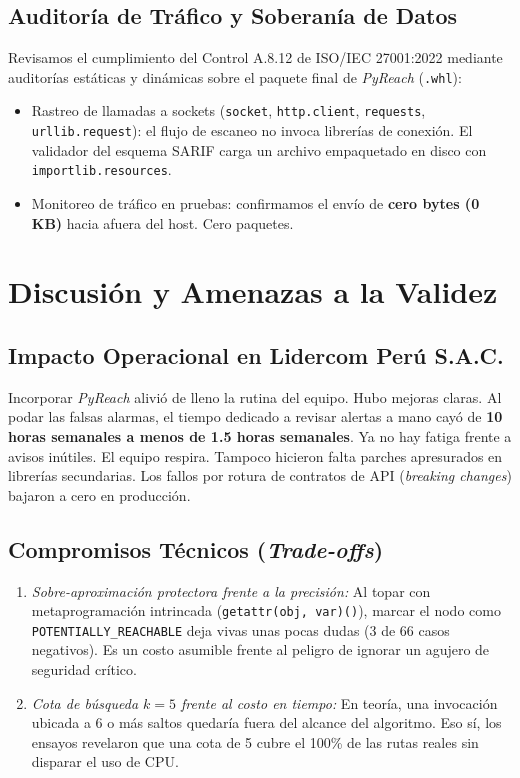\documentclass[conference]{IEEEtran}
\begin{document}
\subsection{Auditoría de Tráfico y Soberanía de Datos}
Revisamos el cumplimiento del Control A.8.12 de ISO/IEC 27001:2022 mediante auditorías estáticas y dinámicas sobre el paquete final de \textit{PyReach} (\texttt{.whl}):
\begin{itemize}
    \item Rastreo de llamadas a sockets (\texttt{socket}, \texttt{http.client}, \texttt{requests}, \texttt{urllib.request}): el flujo de escaneo no invoca librerías de conexión. El validador del esquema SARIF carga un archivo empaquetado en disco con \texttt{importlib.resources}.
    \item Monitoreo de tráfico en pruebas: confirmamos el envío de \textbf{cero bytes (0 KB)} hacia afuera del host. Cero paquetes.
\end{itemize}

\section{Discusión y Amenazas a la Validez}

\subsection{Impacto Operacional en Lidercom Perú S.A.C.}
Incorporar \textit{PyReach} alivió de lleno la rutina del equipo. Hubo mejoras claras. Al podar las falsas alarmas, el tiempo dedicado a revisar alertas a mano cayó de \textbf{10 horas semanales a menos de 1.5 horas semanales}. Ya no hay fatiga frente a avisos inútiles. El equipo respira. Tampoco hicieron falta parches apresurados en librerías secundarias. Los fallos por rotura de contratos de API (\textit{breaking changes}) bajaron a cero en producción.

\subsection{Compromisos Técnicos (\textit{Trade-offs})}
\begin{enumerate}
    \item \textit{Sobre-aproximación protectora frente a la precisión:} Al topar con metaprogramación intrincada (\texttt{getattr(obj, var)()}), marcar el nodo como \texttt{POTENTIALLY\_REACHABLE} deja vivas unas pocas dudas (3 de 66 casos negativos). Es un costo asumible frente al peligro de ignorar un agujero de seguridad crítico.
    \item \textit{Cota de búsqueda $k=5$ frente al costo en tiempo:} En teoría, una invocación ubicada a 6 o más saltos quedaría fuera del alcance del algoritmo. Eso sí, los ensayos revelaron que una cota de 5 cubre el 100\% de las rutas reales sin disparar el uso de CPU.
\end{enumerate}
\end{document}
